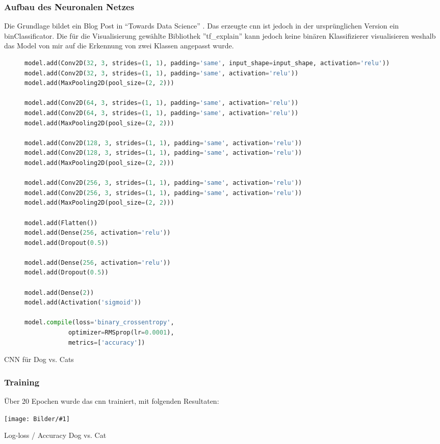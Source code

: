 \documentclass[
  12pt, %
  a4paper, %
  oneside, %
  openany, 
  numbers=noenddot, %
  BCOR=5mm, %
  parskip=half*, %
  thesis, %
]{bfhbook}
\newcommand{\imgText}[3]{
\begin{center}
    \begin{minipage}[t]{0.6\textwidth}
    		\vspace{0pt}
		\texttt{[image: Bilder/\#1]}
		\caption{#2}
	\end{minipage}\hfill
    \begin{minipage}[t]{0.4\textwidth}
    		\vspace{5pt}
  		#3
    \end{minipage}
\end{center}
}
\begin{document}
\subsubsection*{Aufbau des Neuronalen Netzes}
Die Grundlage bildet ein Blog Post in ``Towards Data Science''  \cite{dogVsCats}. Das erzeugte \acrshort{cnn} ist jedoch in der ursprünglichen Version ein \Gls{binClassificator}. Die für die Visualisierung gewählte Bibliothek ''tf\_explain'' \cite{tfExplain} kann jedoch keine binären Klassifizierer visualisieren weshalb das Model von mir auf die Erkennung von zwei Klassen angepasst wurde.

\begin{figure}
\begin{lstlisting}[language=Python]
model.add(Conv2D(32, 3, strides=(1, 1), padding='same', input_shape=input_shape, activation='relu'))
model.add(Conv2D(32, 3, strides=(1, 1), padding='same', activation='relu'))
model.add(MaxPooling2D(pool_size=(2, 2)))

model.add(Conv2D(64, 3, strides=(1, 1), padding='same', activation='relu'))
model.add(Conv2D(64, 3, strides=(1, 1), padding='same', activation='relu'))
model.add(MaxPooling2D(pool_size=(2, 2)))

model.add(Conv2D(128, 3, strides=(1, 1), padding='same', activation='relu'))
model.add(Conv2D(128, 3, strides=(1, 1), padding='same', activation='relu'))
model.add(MaxPooling2D(pool_size=(2, 2)))

model.add(Conv2D(256, 3, strides=(1, 1), padding='same', activation='relu'))
model.add(Conv2D(256, 3, strides=(1, 1), padding='same', activation='relu'))
model.add(MaxPooling2D(pool_size=(2, 2)))

model.add(Flatten())
model.add(Dense(256, activation='relu'))
model.add(Dropout(0.5))

model.add(Dense(256, activation='relu'))
model.add(Dropout(0.5))

model.add(Dense(2))
model.add(Activation('sigmoid'))
    
model.compile(loss='binary_crossentropy',
            optimizer=RMSprop(lr=0.0001),
            metrics=['accuracy'])
\end{lstlisting}
\end{figure}
\caption{CNN für Dog vs. Cats}

\subsubsection*{Training}
Über 20 Epochen wurde das \acrshort{cnn} trainiert, mit folgenden Resultaten:
\imgText{Training-Manipulated-LogLoss.png}{Log-loss / Accuracy Dog vs. Cat}{}
\end{document}
